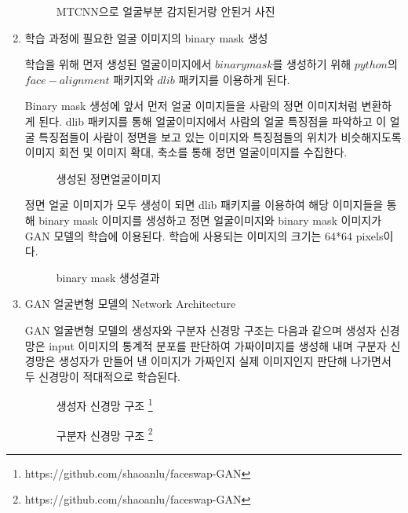 \begin{enumerate}
    \begin{figure}[h!]%
    \centering
    \caption{MTCNN으로 얼굴부분 감지된거랑 안된거 사진}
    \end{figure}


    \item 학습 과정에 필요한 얼굴 이미지의 binary mask 생성

    학습을 위해 먼저 생성된 얼굴이미지에서 $binary mask$를 생성하기 위해 $python$의 $face-alignment$ 패키지와 $dlib$ 패키지를 이용하게 된다.

    Binary mask 생성에 앞서 먼저 얼굴 이미지들을 사람의 정면 이미지처럼 변환하게 된다. dlib 패키지를 통해 얼굴이미지에서 사람의 얼굴 특징점을 파악하고 이 얼굴 특징점들이 사람이 정면을 보고 있는 이미지와 특징점들의 위치가 비슷해지도록 이미지 회전 및 이미지 확대, 축소를 통해 정면 얼굴이미지를 수집한다.
    \begin{figure}[h!] %
    \centering
    \caption{생성된 정면얼굴이미지}
    \end{figure}



    정면 얼굴 이미지가 모두 생성이 되면 dlib 패키지를 이용하여 해당 이미지들을 통해 binary mask 이미지를 생성하고 정면 얼굴이미지와 binary mask 이미지가 GAN 모델의 학습에 이용된다. 학습에 사용되는 이미지의 크기는 64*64 pixels이다. 
    \begin{figure}[h!]%
    \centering
    \caption{binary mask 생성결과}
    \end{figure}


    \item GAN 얼굴변형 모델의 Network Architecture

    GAN 얼굴변형 모델의 생성자와 구분자 신경망 구조는 다음과 같으며 생성자 신경망은 input 이미지의 통계적 분포를 판단하여 가짜이미지를 생성해 내며 구분자 신경망은 생성자가 만들어 낸 이미지가 가짜인지 실제 이미지인지 판단해 나가면서 두 신경망이 적대적으로 학습된다.

    \begin{figure}[h!]
    \centering
    \caption{생성자 신경망 구조 \protect\footnote{https://github.com/shaoanlu/faceswap-GAN}}
    \end{figure}


    \begin{figure}[h!]
    \centering
    \caption{구분자 신경망 구조 \protect\footnote{https://github.com/shaoanlu/faceswap-GAN}}
    \end{figure}


\end{enumerate}
